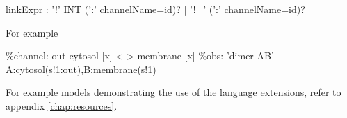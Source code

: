 \begin{bnfsource}
linkExpr :
  '!' INT (':' channelName=id)?
  | '!_' (':' channelName=id)?
\end{bnfsource}
For example
\begin{kappasource}
\%channel: out cytosol [x] <-> membrane [x]
\%obs: 'dimer AB' A:cytosol(s!1:out),B:membrane(s!1) 
\end{kappasource}


\bigskip For example models demonstrating the use of the language extensions, refer to appendix \ref{chap:resources}.

\newpage

